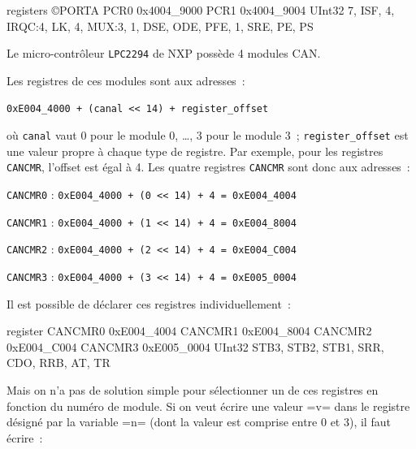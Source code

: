 \begin{PLM}
registers ©PORTA {
  PCR0 0x4004_9000
  PCR1 0x4004_9004
  UInt32 {
    7, ISF, 4, IRQC:4, LK, 4, MUX:3, 1, DSE, ODE, PFE, 1, SRE, PE, PS
  }
}
\end{PLM}












Le micro-contrôleur \texttt{LPC2294} de NXP possède 4 modules CAN.


Les registres de ces modules sont aux adresses~:

\texttt{0xE004\_4000 + (canal << 14) + register\_offset}

où \texttt{canal} vaut $0$ pour le module $0$, …, $3$ pour le module 3~; \texttt{register\_offset} est une valeur propre à chaque type de registre. Par exemple, pour les registres \texttt{CANCMR}, l'offset est égal à 4. Les quatre registres \texttt{CANCMR} sont donc aux adresses~:

\texttt{CANCMR0} : \texttt{0xE004\_4000 + (0 << 14) + 4 = 0xE004\_4004}

\texttt{CANCMR1} : \texttt{0xE004\_4000 + (1 << 14) + 4 = 0xE004\_8004}

\texttt{CANCMR2} : \texttt{0xE004\_4000 + (2 << 14) + 4 = 0xE004\_C004}

\texttt{CANCMR3} : \texttt{0xE004\_4000 + (3 << 14) + 4 = 0xE005\_0004}

Il est possible de déclarer ces registres individuellement~:

\begin{PLM}
register
  CANCMR0 0xE004_4004
  CANCMR1 0xE004_8004
  CANCMR2 0xE004_C004
  CANCMR3 0xE005_0004
UInt32 {
  STB3, STB2, STB1, SRR, CDO, RRB, AT, TR
}
\end{PLM}

Mais on n'a pas de solution simple pour sélectionner un de ces registres en fonction du numéro de module. Si on veut écrire une valeur \plm=v= dans le registre désigné par la variable \plm=n= (dont la valeur est comprise entre $0$ et $3$), il faut écrire~:

